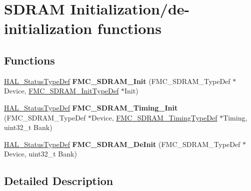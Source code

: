 \hypertarget{group___f_m_c___l_l___s_d_r_a_m___private___functions___group1}{}\section{S\+D\+R\+AM Initialization/de-\/initialization functions}
\label{group___f_m_c___l_l___s_d_r_a_m___private___functions___group1}
\subsection*{Functions}
\begin{DoxyCompactItemize}
\item 
\hyperlink{stm32f4xx__hal__def_8h_a63c0679d1cb8b8c684fbb0632743478f}{H\+A\+L\+\_\+\+Status\+Type\+Def} {\bfseries F\+M\+C\+\_\+\+S\+D\+R\+A\+M\+\_\+\+Init} (F\+M\+C\+\_\+\+S\+D\+R\+A\+M\+\_\+\+Type\+Def $\ast$Device, \hyperlink{struct_f_m_c___s_d_r_a_m___init_type_def}{F\+M\+C\+\_\+\+S\+D\+R\+A\+M\+\_\+\+Init\+Type\+Def} $\ast$Init)\hypertarget{group___f_m_c___l_l___s_d_r_a_m___private___functions___group1_gac31e934f1ffb131dccc62b6fe6844560}{}\label{group___f_m_c___l_l___s_d_r_a_m___private___functions___group1_gac31e934f1ffb131dccc62b6fe6844560}

\item 
\hyperlink{stm32f4xx__hal__def_8h_a63c0679d1cb8b8c684fbb0632743478f}{H\+A\+L\+\_\+\+Status\+Type\+Def} {\bfseries F\+M\+C\+\_\+\+S\+D\+R\+A\+M\+\_\+\+Timing\+\_\+\+Init} (F\+M\+C\+\_\+\+S\+D\+R\+A\+M\+\_\+\+Type\+Def $\ast$Device, \hyperlink{struct_f_m_c___s_d_r_a_m___timing_type_def}{F\+M\+C\+\_\+\+S\+D\+R\+A\+M\+\_\+\+Timing\+Type\+Def} $\ast$Timing, uint32\+\_\+t Bank)\hypertarget{group___f_m_c___l_l___s_d_r_a_m___private___functions___group1_ga7c28889074955caf3b854e8c99dced73}{}\label{group___f_m_c___l_l___s_d_r_a_m___private___functions___group1_ga7c28889074955caf3b854e8c99dced73}

\item 
\hyperlink{stm32f4xx__hal__def_8h_a63c0679d1cb8b8c684fbb0632743478f}{H\+A\+L\+\_\+\+Status\+Type\+Def} {\bfseries F\+M\+C\+\_\+\+S\+D\+R\+A\+M\+\_\+\+De\+Init} (F\+M\+C\+\_\+\+S\+D\+R\+A\+M\+\_\+\+Type\+Def $\ast$Device, uint32\+\_\+t Bank)\hypertarget{group___f_m_c___l_l___s_d_r_a_m___private___functions___group1_ga893cc61d8d10a5f828937665c32ae6a3}{}\label{group___f_m_c___l_l___s_d_r_a_m___private___functions___group1_ga893cc61d8d10a5f828937665c32ae6a3}

\end{DoxyCompactItemize}


\subsection{Detailed Description}
